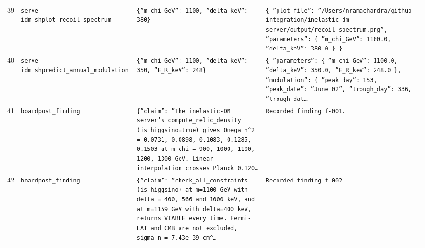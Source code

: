 \documentclass[11pt,a4paper]{article}
\begin{document}
\begin{longtable}{@{}p{}p{}p{}p{}@{}}
39 & \texttt{serve-idm.sh}\newline\texttt{plot\_\allowbreak{}recoil\_\allowbreak{}spectrum} & \texttt{\{''m\_\allowbreak{}chi\_\allowbreak{}GeV'':\allowbreak{} 1100,\allowbreak{} ''delta\_\allowbreak{}keV'':\allowbreak{} 380\}\allowbreak{}} & \texttt{\{   ''plot\_\allowbreak{}file'':\allowbreak{} ''/\allowbreak{}Users/\allowbreak{}nramachandra/\allowbreak{}github-integration/\allowbreak{}inelastic-dm-server/\allowbreak{}output/\allowbreak{}recoil\_\allowbreak{}spectrum.png'',\allowbreak{}   ''parameters'':\allowbreak{} \{     ''m\_\allowbreak{}chi\_\allowbreak{}GeV'':\allowbreak{} 1100.0,\allowbreak{}     ''delta\_\allowbreak{}keV'':\allowbreak{} 380.0   \}\allowbreak{} \}\allowbreak{}} \\
40 & \texttt{serve-idm.sh}\newline\texttt{predict\_\allowbreak{}annual\_\allowbreak{}modulation} & \texttt{\{''m\_\allowbreak{}chi\_\allowbreak{}GeV'':\allowbreak{} 1100,\allowbreak{} ''delta\_\allowbreak{}keV'':\allowbreak{} 350,\allowbreak{} ''E\_\allowbreak{}R\_\allowbreak{}keV'':\allowbreak{} 248\}\allowbreak{}} & \texttt{\{   ''parameters'':\allowbreak{} \{     ''m\_\allowbreak{}chi\_\allowbreak{}GeV'':\allowbreak{} 1100.0,\allowbreak{}     ''delta\_\allowbreak{}keV'':\allowbreak{} 350.0,\allowbreak{}     ''E\_\allowbreak{}R\_\allowbreak{}keV'':\allowbreak{} 248.0   \}\allowbreak{},\allowbreak{}   ''modulation'':\allowbreak{} \{     ''peak\_\allowbreak{}day'':\allowbreak{} 153,\allowbreak{}     ''peak\_\allowbreak{}date'':\allowbreak{} ''June 02'',\allowbreak{}     ''trough\_\allowbreak{}day'':\allowbreak{} 336,\allowbreak{}     ''trough\_\allowbreak{}dat\ldots{}\allowbreak{}} \\
41 & \texttt{board}\newline\texttt{post\_\allowbreak{}finding} & \texttt{\{''claim'':\allowbreak{} ''The inelastic-DM server's compute\_\allowbreak{}relic\_\allowbreak{}density (is\_\allowbreak{}higgsino=\allowbreak{}true)\allowbreak{} gives Omega h\textasciicircum{}\allowbreak{}2 =\allowbreak{} 0.0731,\allowbreak{} 0.0898,\allowbreak{} 0.1083,\allowbreak{} 0.1285,\allowbreak{} 0.1503 at m\_\allowbreak{}chi =\allowbreak{} 900,\allowbreak{} 1000,\allowbreak{} 1100,\allowbreak{} 1200,\allowbreak{} 1300 GeV. Linear interpolation crosses Planck 0.120\ldots{}\allowbreak{}} & \texttt{Recorded finding f-001.} \\
42 & \texttt{board}\newline\texttt{post\_\allowbreak{}finding} & \texttt{\{''claim'':\allowbreak{} ''check\_\allowbreak{}all\_\allowbreak{}constraints (is\_\allowbreak{}higgsino)\allowbreak{} at m=\allowbreak{}1100 GeV with delta =\allowbreak{} 400,\allowbreak{} 566 and 1000 keV,\allowbreak{} and at m=\allowbreak{}1159 GeV with delta=\allowbreak{}400 keV,\allowbreak{} returns VIABLE every time. Fermi-LAT and CMB are not excluded,\allowbreak{} sigma\_\allowbreak{}n =\allowbreak{} 7.43e-39 cm\textasciicircum{}\allowbreak{}\ldots{}\allowbreak{}} & \texttt{Recorded finding f-002.} \\

\end{longtable}
\end{document}
